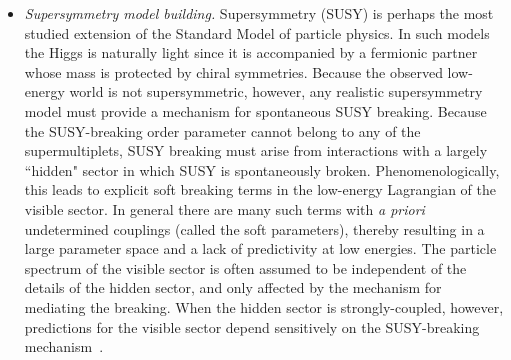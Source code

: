 \begin{itemize}
\item{\it Supersymmetry model building.}  Supersymmetry (SUSY) is perhaps the most studied extension of the
Standard Model of particle physics. In such models the Higgs is naturally light since it is accompanied by a fermionic partner whose mass is protected by chiral symmetries.   Because the observed low-energy world is not supersymmetric, however, any realistic supersymmetry model must provide a mechanism
for spontaneous SUSY breaking.  Because the SUSY-breaking order parameter cannot belong to any of the supermultiplets, SUSY breaking must arise from interactions with a largely ``hidden" sector in which SUSY is spontaneously broken.   Phenomenologically, this leads to
explicit soft breaking terms in the low-energy Lagrangian of the visible sector.  In general there are many such terms with {\it a priori} undetermined couplings (called the soft parameters), thereby resulting in a large parameter space and a lack of predictivity at low energies.  The particle spectrum of the visible sector is often assumed to be independent of the details of the hidden sector, and only affected by the mechanism for mediating the breaking.  When the hidden sector is strongly-coupled, however, predictions for the visible sector depend sensitively on the SUSY-breaking mechanism~\cite{Cohen:2006qc,Murayama:2007ge}.


\end{itemize}
